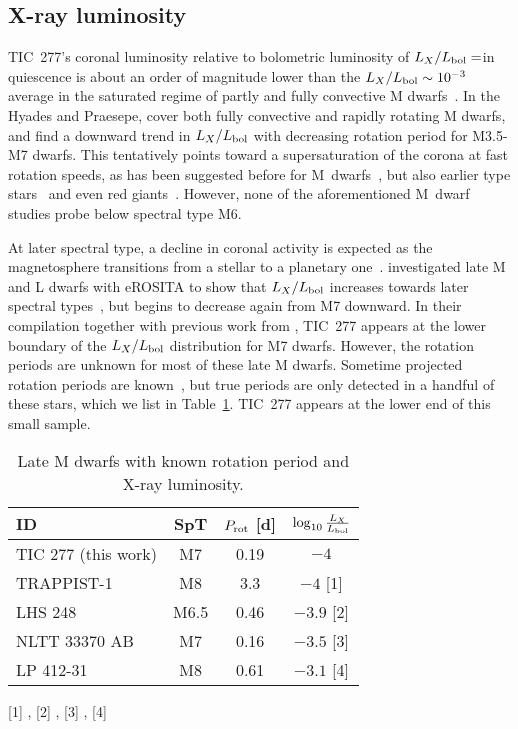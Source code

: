 \documentclass[twocolumn]{aastex631}
\begin{document}
\subsection{X-ray luminosity}
\label{sec:discussion:xraylum}
TIC~277's coronal luminosity relative to bolometric luminosity of $L_X/L_{\rm bol}=$\LXLbol in quiescence is about an order of magnitude lower than the $L_X/L_{\rm bol}\sim 10^{-3}$ average in the saturated regime of partly and fully convective M dwarfs~\citep{wright2011stellaractivityrotation,wright2018stellar}. In the Hyades and Praesepe, \citet{nunez2022factory} cover both fully convective and rapidly rotating M dwarfs, and find a downward trend in $L_X/L_{\rm bol}$ with decreasing rotation period for M3.5-M7 dwarfs. This tentatively points toward a supersaturation of the corona at fast rotation speeds, as has been suggested before for M~dwarfs~\citep{jeffries2011investigating}, but also earlier type stars~\citep{prosser1996rosat, argiroffi2016supersaturation} and even red giants~\citep{dixon2020rotationally}. However, none of the aforementioned M~dwarf studies probe below spectral type M6. 

At later spectral type, a decline in coronal activity is expected as the magnetosphere transitions from a stellar to a planetary one~\citep{pineda2017panchromatic}. \citet{stelzer2022first} investigated late M and L dwarfs with eROSITA to show that $L_X/L_{\rm bol}$ increases towards later spectral types~\citep{magaudda2022firsta}, but begins to decrease again from M7 downward. In their compilation together with previous work from \citet{stelzer2012ultracool, cook2014trends, deluca2020extras, williams2014trends}, TIC~277 appears at the lower boundary of the $L_X/L_{\rm bol}$ distribution for M7 dwarfs. However, the rotation periods are unknown for most of these late M dwarfs. Sometime projected rotation periods are known~\citep{cook2014trends}, but true periods are only detected in a handful of these stars, which we list in Table~\ref{tab:latmlxlbol}. TIC~277 appears at the lower end of this small sample.

\begin{table}[]
    \centering
    \caption{Late M dwarfs with known rotation period and X-ray luminosity.}
    \begin{tabular}{lccc}
        ID & SpT &$P_{\rm rot}$ [d] & $\log_{10} \frac{L_X}{L_{\rm bol}} $\\\hline
        TIC 277 (this work) & M7 & 0.19 & $-4$ \\
        TRAPPIST-1 & M8 & 3.3 & $-4$ [1]\\
        LHS 248 & M6.5 & 0.46 & $-3.9$ [2] \\
        NLTT 33370 AB & M7 & 0.16 & $-3.5$ [3] \\
        LP 412-31 & M8 & 0.61 & $-3.1$ [4]\\\hline
    \end{tabular}
    \flushleft
     \footnotesize
    [1] \citet{brown2023coronal}, 
    [2] \citet{cook2014trends}, 
    [3] \citet{williams2015simultaneous}, 
    [4] \citet{stelzer2006simultaneous}    
    \label{tab:latmlxlbol}
\end{table}
\end{document}
